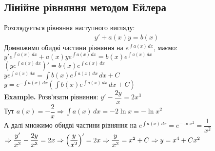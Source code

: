 \documentclass[a4paper, 14pt]{extarticle}
\def\huge{\displaystyle}
\def\bigline{\vspace{5mm}\\}
\begin{document}
\subsection{Лінійне рівняння методом Ейлера}
Розглядується рівняння наступного вигляду:
\begin{align*}
y' + a(x)y = b(x)
\end{align*}
Домножимо обидві частини рівняння на $e^{\int a(x)\,dx}$, маємо:\\
$y' e^{\int a(x)\,dx} + a(x)y e^{\int a(x)\,dx} = b(x)e^{\int a(x)\,dx}$\\
$\left( y e^{\int a(x)\,dx} \right)' = b(x) e^{\int a(x)\,dx}$\\
$y e^{\int a(x)\,dx} = \huge \int b(x) e^{\int a(x)\,dx} \,dx + C$\\
$y = e^{-\int a(x)\,dx} \left(\huge \int b(x) e^{\int a(x)\,dx} \,dx + C \right)$
\bigline
\textbf{Example.} Розв'язати рівняння: $y' - \dfrac{2y}{x} = 2x^3$\\
Тут $a(x) = -\dfrac{2}{x} \Rightarrow \huge \int a(x)\,dx = -2 \ln x = -\ln x^2$\\
А далі множимо обидві частини рівняння на $e^{\int a(x)\,dx} = e^{-\ln x^2} = \dfrac{1}{x^2}$\\
$\Rightarrow \dfrac{y'}{x^2} - \dfrac{2y}{x^3} = 2x \Rightarrow \left( \dfrac{y}{x^2} \right)' = 2x \Rightarrow \dfrac{y}{x^2} = x^2 + C \\ \Rightarrow y = x^4 + Cx^2$
\bigline
\end{document}
